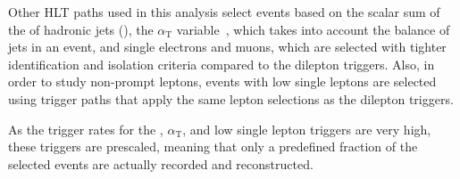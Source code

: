 Other HLT paths used in this analysis select events based on the scalar sum of the \pt of hadronic jets (\HT), the $\alpha_{\mathrm{T}}$ variable~\cite{Khachatryan2011196}, which takes into account the balance of jets in an event, and single electrons and muons, which are selected with tighter identification and isolation criteria compared to the dilepton triggers. Also, in order to study non-prompt leptons, events with low \pt single leptons are selected using trigger paths that apply the same lepton selections as the dilepton triggers.  

As the trigger rates for the \HT, $\alpha_{\mathrm{T}}$, and low \pt single lepton triggers are very high, these triggers are prescaled, meaning that only a predefined fraction of the selected events are actually recorded and reconstructed.

  


